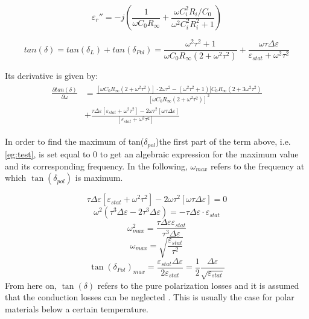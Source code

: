 \begin{equation}
\varepsilon_r'' = -j \left(\frac{1}{\omega C_0 R_\infty}+\frac{\omega C_i^2 R_i / C_0}{\omega^2 C_i^2 R_i^2 +1} \right)
\end{equation}

\begin{equation}
tan(\delta) = tan(\delta_L) + tan( \delta_{Pol}) = \frac{\omega^2 \tau^2+1}{\omega C_0 R_\infty (2+ \omega^2 \tau^2)}+\frac{\omega \tau \Delta \varepsilon}{\varepsilon_{stat} + \omega^2 \tau^2}
\end{equation}

Its derivative is given by: 
\begin{align}
\begin{split}
\frac{\partial tan(\delta)}{ \partial \omega} & = \frac{[\omega C_0 R_\infty (2+\omega^2 \tau^2)]\cdot 2 \omega \tau^2 - (\omega^2 \tau^2 +1) [C_0 R_\infty (2+3 \omega^2 \tau^2)  }{[\omega C_0 R_\infty (2+\omega^2 \tau^2)]^2}\\
					      & + \frac{\tau \Delta \varepsilon [\varepsilon_{stat} + \omega^2 \tau^2] - 2 \omega \tau^2 [\omega \tau \Delta \varepsilon]}{[\varepsilon_{stat} +\omega^2 \tau^2]}
\label{eg:test}
\end{split}
\end{align}
					      
In order to find the maximum of tan($\delta_{pol}$)the first part of the term above, i.e. \eqref{eg:test}, is set equal to 0 to get an algebraic expression for the maximum value and its corresponding frequency. In the following, $\omega_{max}$ refers to the frequency at which $\tan(\delta_{pol})$ is maximum.

\begin{equation}
\tau \Delta \varepsilon [\varepsilon_{stat} + \omega^2 \tau^2] -2\omega \tau^2 [\omega \tau \Delta \varepsilon] = 0
\end{equation}
\begin{equation}
\omega^2 (\tau^3 \Delta \varepsilon -2 \tau^3 \Delta \varepsilon) = - \tau \Delta \varepsilon \cdot \varepsilon_{stat}
\end{equation}
\begin{equation}
\omega_{max}^2 = \frac{\tau \Delta \varepsilon \varepsilon_{stat}}{\tau^3 \Delta \varepsilon}
\end{equation}
\begin{equation}
\omega_{max} = \sqrt{\frac{\varepsilon_{stat}}{\tau^2}}
\end{equation}
\begin{equation}
\tan(\delta_{Pol})_{max} = \frac{\varepsilon_{stat} \Delta\varepsilon}{2\varepsilon_{stat}} = \frac{1}{2} \frac{\Delta \varepsilon}{\sqrt{\varepsilon_{stat}}}
\end{equation}
From here on, $\tan(\delta)$ refers to the pure polarization losses and it is assumed that the conduction losses can be neglected . This is usually the case for polar materials below a certain temperature. 

